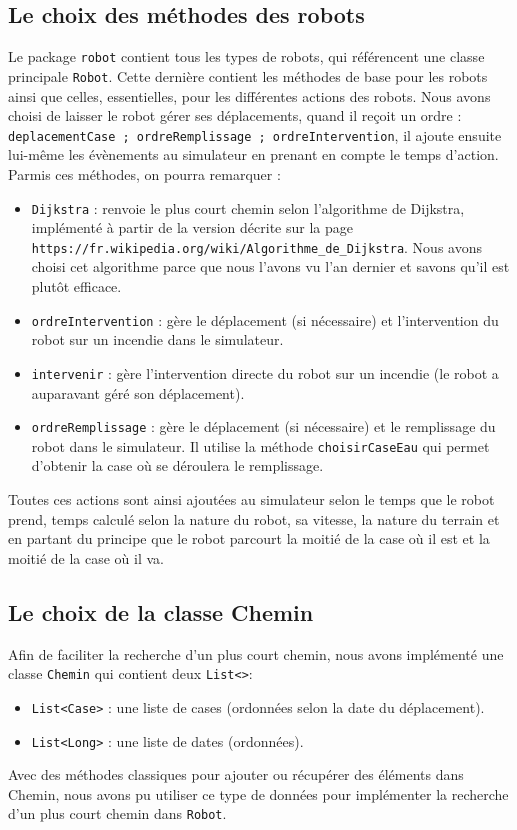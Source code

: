 \documentclass[12pt]{article}
\begin{document}
\subsection{Le choix des méthodes des robots}
Le package {\tt robot} contient tous les types de robots, qui référencent une classe principale {\tt Robot}. Cette dernière contient les méthodes de base pour les robots ainsi que celles, essentielles, pour les différentes actions des robots. Nous avons choisi de laisser le robot gérer ses déplacements, quand il reçoit un ordre : {\tt deplacementCase ; ordreRemplissage ; ordreIntervention}, il ajoute ensuite lui-même les évènements au simulateur en prenant en compte le temps d'action.\\
Parmis ces méthodes, on pourra remarquer :
\begin{itemize}
  \item {\tt Dijkstra} : renvoie le plus court chemin selon l'algorithme de Dijkstra, implémenté à partir de la version décrite sur la page \\ {\tt  https://fr.wikipedia.org/wiki/Algorithme\_de\_Dijkstra}. Nous avons choisi cet algorithme parce que nous l'avons vu l'an dernier et savons qu'il est plutôt efficace.
  \item {\tt ordreIntervention} : gère le déplacement (si nécessaire) et l'intervention du robot sur un incendie dans le simulateur.
  \item {\tt intervenir} : gère l'intervention directe du robot sur un incendie (le robot a auparavant géré son déplacement).
  \item {\tt ordreRemplissage} : gère le déplacement (si nécessaire) et le remplissage du robot dans le simulateur. Il utilise la méthode {\tt choisirCaseEau} qui permet d'obtenir la case où se déroulera le remplissage.
\end{itemize}
Toutes ces actions sont ainsi ajoutées au simulateur selon le temps que le robot prend, temps calculé selon la nature du robot, sa vitesse, la nature du terrain et en partant du principe que le robot parcourt la moitié de la case où il est et la moitié de la case où il va.

\subsection{Le choix de la classe Chemin}
Afin de faciliter la recherche d'un plus court chemin, nous avons implémenté une classe {\tt Chemin} qui contient deux {\tt List<>}:
\begin{itemize}
  \item {\tt List<Case>} : une liste de cases (ordonnées selon la date du déplacement).
  \item {\tt List<Long>} : une liste de dates (ordonnées).
\end{itemize}
Avec des méthodes classiques pour ajouter ou récupérer des éléments dans Chemin, nous avons pu utiliser ce type de données pour implémenter la recherche d'un plus court chemin dans {\tt Robot}.
\end{document}
